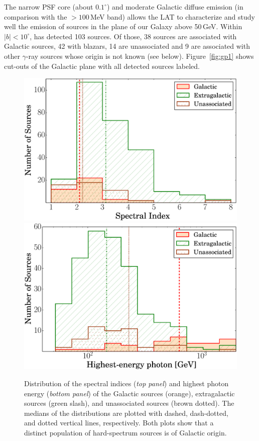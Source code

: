 The narrow PSF core (about $0.1^{\circ}$) and moderate Galactic diffuse emission (in comparison with the $>100$\,MeV band) allows the LAT to characterize and study well the emission of sources in the plane of our Galaxy above 50\,GeV. Within $|b|<10^{\circ}$, \lat{} has detected 103 sources.
Of those, 38 sources are associated with Galactic sources, 42 with blazars, 14 are unassociated and 9 are associated with other $\gamma$-ray sources
whose origin is not known (see below).
Figure~\ref{fig:gp1} shows cut-outs of the Galactic plane with all detected sources labeled.

\begin{figure}[!ht]
	\begin{centering}
		\includegraphics[width=0.9\columnwidth]{Figures/hist_index-new.eps}
		 \includegraphics[width=0.9\columnwidth]{Figures/hist_hep-new.eps} 
		\caption{Distribution of the spectral indices ({\it top panel}) and highest photon energy ({\it bottom panel}) of the Galactic sources (orange), extragalactic sources (green slash), and unassociated sources (brown dotted). The medians of the distributions are plotted with dashed, dash-dotted, and dotted vertical lines, respectively. Both plots show that a distinct population of hard-spectrum sources is of Galactic origin.
			\label{fig:hist_index}}
	\end{centering}
\end{figure}

